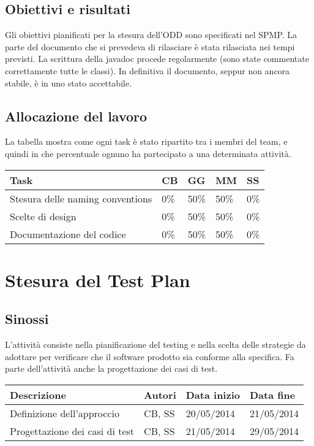 \subsection{Obiettivi e risultati}
Gli obiettivi pianificati per la stesura dell'ODD sono specificati nel SPMP. La parte del documento che si prevedeva di rilasciare è stata rilasciata nei tempi previsti. La scrittura della javadoc procede regolarmente (sono state commentate correttamente tutte le classi). In definitiva il documento, seppur non ancora stabile, è in uno stato accettabile.

\subsection{Allocazione del lavoro}
La tabella mostra come ogni task è stato ripartito tra i membri del team, e quindi in che percentuale ognuno ha partecipato a una determinata attività.
\begin{table}[ht]
 \begin{tabular}{|p{7.5cm}|p{1cm}|p{1cm}|p{1cm}|p{1cm}|}
  \hline
  \rowcolor{Gray}\textbf{Task}			& \textbf{CB}		& \textbf{GG}		& \textbf{MM}		& \textbf{SS}		\\
  \hline
  Stesura delle naming conventions		& 0\%			& 50\%			& 50\%			& 0\%			\\
  \hline
  Scelte di design				& 0\%			& 50\%			& 50\%			& 0\%			\\
  \hline
  Documentazione del codice			& 0\%			& 50\%			& 50\%			& 0\%			\\
  \hline
 \end{tabular}
\end{table}



\section{Stesura del Test Plan}
\subsection{Sinossi}
L'attività consiste nella pianificazione del testing e nella scelta delle strategie da adottare per verificare che il software prodotto sia conforme alla specifica. Fa parte dell'attività anche la progettazione dei casi di test.

\begin{table}[ht]
 \begin{tabular}{|p{6cm}|p{2cm}|p{2cm}|p{2cm}|}
    \hline
    \rowcolor{Gray}\textbf{Descrizione}			& \textbf{Autori}		& \textbf{Data inizio}			& \textbf{Data fine}	\\
    \hline
    Definizione dell'approccio				& CB, SS			& 20/05/2014				& 21/05/2014		\\
    \hline
    Progettazione dei casi di test			& CB, SS			& 21/05/2014				& 29/05/2014		\\
    \hline
 \end{tabular}
\end{table}

